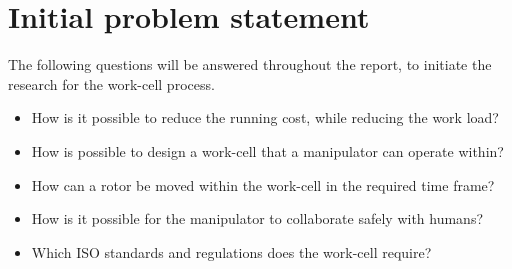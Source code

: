 \section{Initial problem statement}\label{ch:Initial problem statment}


The following questions will be answered throughout the report, to initiate the research for the work-cell process.

\begin{itemize}
    \item How is it possible to reduce the running cost, while reducing the work load?
    \item How is possible to design a work-cell that a manipulator can operate within?
    \item How can a rotor be moved within the work-cell in the required time frame?
    \item How is it possible for the manipulator to collaborate safely with humans?
    \item Which ISO standards and regulations does the work-cell require?
\end{itemize}

